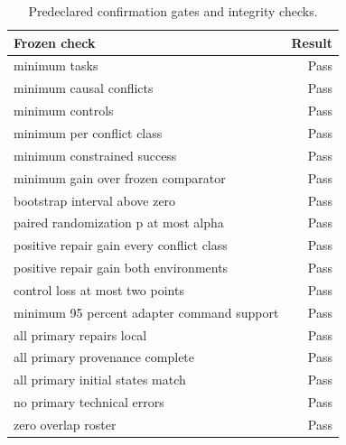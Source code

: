 \begin{table}[t]
\centering
\small
\caption{Predeclared confirmation gates and integrity checks.}
\begin{tabular}{lr}
\toprule
Frozen check & Result \\
\midrule
minimum tasks & Pass \\
minimum causal conflicts & Pass \\
minimum controls & Pass \\
minimum per conflict class & Pass \\
minimum constrained success & Pass \\
minimum gain over frozen comparator & Pass \\
bootstrap interval above zero & Pass \\
paired randomization p at most alpha & Pass \\
positive repair gain every conflict class & Pass \\
positive repair gain both environments & Pass \\
control loss at most two points & Pass \\
minimum 95 percent adapter command support & Pass \\
all primary repairs local & Pass \\
all primary provenance complete & Pass \\
all primary initial states match & Pass \\
no primary technical errors & Pass \\
zero overlap roster & Pass \\
\bottomrule
\end{tabular}
\end{table}
